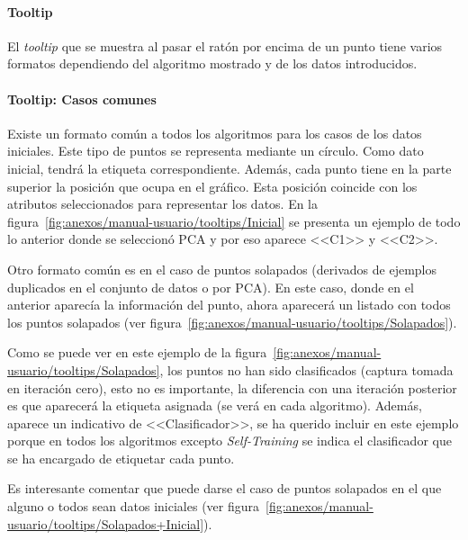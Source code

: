 \paragraph{Tooltip} El \textit{tooltip} que se muestra al pasar el ratón por
encima de un punto tiene varios formatos dependiendo del algoritmo mostrado y de
los datos introducidos.

\paragraph{Tooltip: Casos comunes}

Existe un formato común a todos los algoritmos para los casos de los datos
iniciales. Este tipo de puntos se representa mediante un círculo. Como dato
inicial, tendrá la etiqueta correspondiente. Además, cada punto tiene en la
parte superior la posición que ocupa en el gráfico. Esta posición coincide con
los atributos seleccionados para representar los datos. En la
figura~\ref{fig:anexos/manual-usuario/tooltips/Inicial} se presenta un ejemplo
de todo lo anterior donde se seleccionó PCA y por eso aparece <<C1>> y <<C2>>.


Otro formato común es en el caso de puntos solapados (derivados de ejemplos
duplicados en el conjunto de datos o por PCA). En este caso, donde en el
anterior aparecía la información del punto, ahora aparecerá un listado con todos
los puntos solapados (ver
figura~\ref{fig:anexos/manual-usuario/tooltips/Solapados}).


Como se puede ver en este ejemplo de la
figura~\ref{fig:anexos/manual-usuario/tooltips/Solapados}, los puntos no han
sido clasificados (captura tomada en iteración cero), esto no es importante, la
diferencia con una iteración posterior es que aparecerá la etiqueta asignada (se
verá en cada algoritmo). Además, aparece un indicativo de <<Clasificador>>, se
ha querido incluir en este ejemplo porque en todos los algoritmos excepto
\textit{Self-Training} se indica el clasificador que se ha encargado de
etiquetar cada punto.

Es interesante comentar que puede darse el caso de puntos solapados en el que
alguno o todos sean datos iniciales (ver
figura~\ref{fig:anexos/manual-usuario/tooltips/Solapados+Inicial}).

